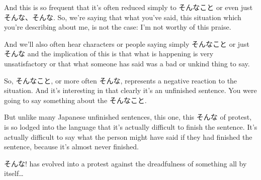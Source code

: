 And this is so frequent that it's often reduced simply to そんなこと or even just そんな、そんな. So, we're saying that what you've said, this situation which you're describing about me, is not the case: I'm not worthy of this praise.

And we'll also often hear characters or people saying simply そんなこと or just そんな and the implication of this is that what is happening is very unsatisfactory or that what someone has said was a bad or unkind thing to say.

{}

So, そんなこと, or more often そんな, represents a negative reaction to the situation. And it's interesting in that clearly it's an unfinished sentence. You were going to say something about the そんなこと.

But unlike many Japanese unfinished sentences, this one, this そんな of protest, is so lodged into the language that it's actually difficult to finish the sentence. It's actually difficult to say what the person might have said if they had finished the sentence, because it's almost never finished.

そんな! has evolved into a protest against the dreadfulness of something all by itself\ldots{}

\stopsectionlevel

\stopsectionlevel
